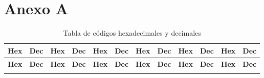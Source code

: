 \documentclass[11pt,a4paper]{book}
\begin{document}
\appendix

\section{Anexo A}

\begin{longtable}{|c|c||c|c||c|c||c|c||c|c||c|c|}
\caption{Tabla de códigos hexadecimales y decimales}\label{tab:hex-dec} \\
\hline
\textbf{Hex} & \textbf{Dec} & \textbf{Hex} & \textbf{Dec} & \textbf{Hex} & \textbf{Dec} & \textbf{Hex} & \textbf{Dec} & \textbf{Hex} & \textbf{Dec} & \textbf{Hex} & \textbf{Dec} \\
\hline
\endfirsthead
\hline
\textbf{Hex} & \textbf{Dec} & \textbf{Hex} & \textbf{Dec} & \textbf{Hex} & \textbf{Dec} & \textbf{Hex} & \textbf{Dec} & \textbf{Hex} & \textbf{Dec} & \textbf{Hex} & \textbf{Dec} \\
\hline
\endhead
\hline
\endfoot
\hline
\endlastfoot


\end{longtable}
\end{document}
